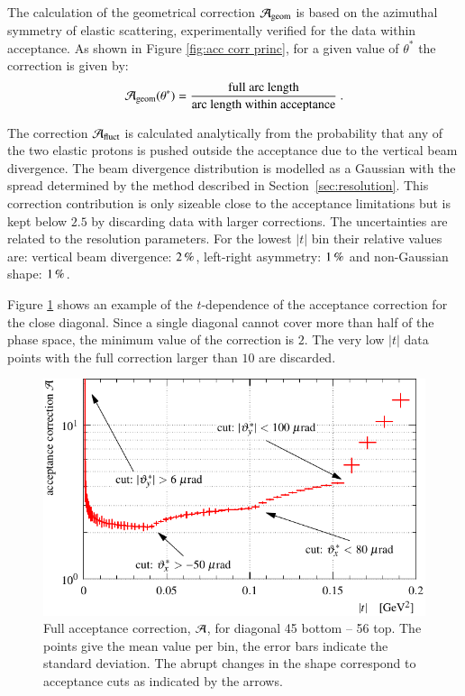 The calculation of the geometrical correction ${\cal A}_{\rm geom}$ is based on the azimuthal symmetry of elastic scattering, experimentally verified for the data within acceptance. As shown in Figure \ref{fig:acc corr princ}, for a given value of $\theta^*$ the correction is given by:
\begin{equation}
\label{eq:acc geom}
{\cal A_{\rm geom}}(\theta^*) = {
	\hbox{full arc length}\over 
	\hbox{arc length within acceptance}
} \ .
\end{equation}

The correction ${\cal A}_{\rm fluct}$ is calculated analytically from the probability that any of the two elastic protons is pushed outside the acceptance due to the vertical beam divergence. The beam divergence distribution is modelled as a Gaussian with the spread determined by the method described in Section~\ref{sec:resolution}. This correction contribution is only sizeable close to the acceptance limitations but is kept below $2.5$ by discarding data with larger corrections. The uncertainties are related to the resolution parameters. For the lowest $|t|$ bin their relative values are: vertical beam divergence: $2\,{\rm \%}$, left-right asymmetry: $1\,{\rm \%}$ and non-Gaussian shape: $1\,{\rm \%}$.

Figure \ref{fig:acc corr res} shows an example of the $t$-dependence of the acceptance correction for the close diagonal. Since a single diagonal cannot cover more than half of the phase space, the minimum value of the correction is $2$. The very low $|t|$ data points with the full correction larger than $10$ are discarded.


\begin{figure}
\begin{center}
\includegraphics{fig/acc_corr_hist_lab.pdf}
\caption{%
Full acceptance correction, ${\cal A}$, for diagonal 45 bottom -- 56 top. The points give the mean value per bin, the error bars indicate the standard deviation. The abrupt changes in the shape correspond to acceptance cuts as indicated by the arrows.
}
\label{fig:acc corr res}
\end{center}
\end{figure}



